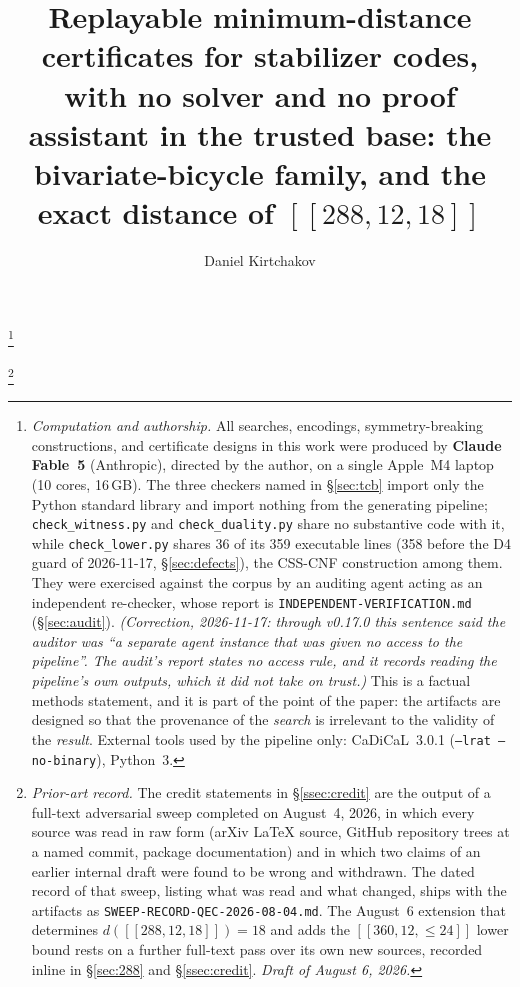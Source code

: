\documentclass[11pt]{amsart}
\theoremstyle{plain}
\theoremstyle{definition}
\theoremstyle{remark}
\begin{document}
\title[Replayable distance certificates for stabilizer codes]{Replayable
minimum-distance certificates for stabilizer codes, with no solver and no
proof assistant in the trusted base: the bivariate-bicycle family, and the
exact distance of $[[288,12,18]]$}

\author{Daniel Kirtchakov}
\address{Independent researcher, Half Ounce Research}

\thanks{\emph{Computation and authorship.} All searches, encodings,
symmetry-breaking constructions, and certificate designs in this work were
produced by \textbf{Claude Fable~5} (Anthropic), directed by the author, on a
single Apple~M4 laptop (10 cores, 16\,GB). The three checkers named in
\S\ref{sec:tcb} import only the Python standard library and import nothing from
the generating pipeline; \texttt{check\_witness.py} and \texttt{check\_duality.py}
share no substantive code with it, while \texttt{check\_lower.py} shares 36 of
its 359 executable lines (358 before the D4 guard of 2026-11-17,
\S\ref{sec:defects}), the CSS-CNF construction among them. They were
exercised against the corpus by an auditing agent acting as an independent
re-checker, whose report is \texttt{INDEPENDENT-VERIFICATION.md}
(\S\ref{sec:audit}). \emph{(Correction, 2026-11-17: through v0.17.0 this
sentence said the auditor was ``a separate agent instance that was given no
access to the pipeline''. The audit's report states no access rule, and it
records reading the pipeline's own outputs, which it did not take on trust.)}
This is a factual methods statement,
and it is part of the point of the paper: the artifacts are designed so that
the provenance of the \emph{search} is irrelevant to the validity of the
\emph{result}. External tools used by the pipeline only: CaDiCaL~3.0.1
(\texttt{--lrat --no-binary}), Python~3.}

\thanks{\emph{Prior-art record.} The credit statements in
\S\ref{ssec:credit} are the output of a full-text adversarial sweep completed
on August~4, 2026, in which every source was read in raw form (arXiv LaTeX
source, GitHub repository trees at a named commit, package documentation) and
in which two claims of an earlier internal draft were found to be wrong and
withdrawn. The dated record of that sweep, listing what was read and what
changed, ships with the artifacts as
\texttt{SWEEP-RECORD-QEC-2026-08-04.md}. The August~6 extension that
determines $d([[288,12,18]])=18$ and adds the $[[360,12,\le24]]$ lower bound
rests on a further full-text pass over its own new sources, recorded inline in
\S\ref{sec:288} and \S\ref{ssec:credit}. \emph{Draft of August 6, 2026.}}
\end{document}
